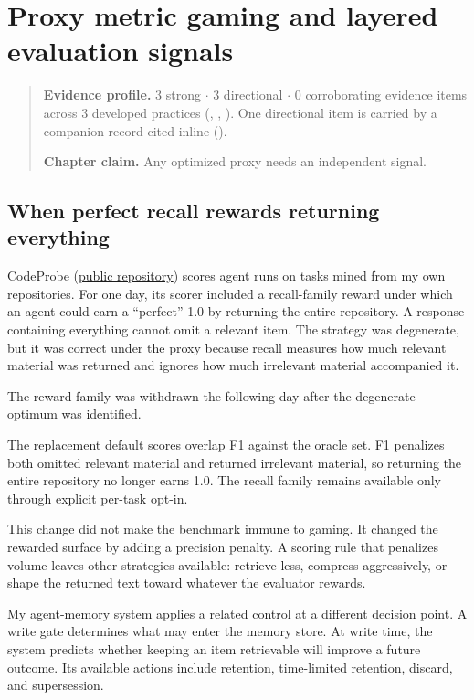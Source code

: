 \chapter{Proxy metric gaming and layered evaluation signals}
\label{ch06-proxy-gaming-layered-signals}
\begin{quote}
\textbf{Evidence profile.} 3 strong \(\cdot\) 3 directional \(\cdot\) 0 corroborating evidence items across 3 developed practices (, , ). One directional item is carried by a companion record cited inline ().

\textbf{Chapter claim.} Any optimized proxy needs an independent signal.
\end{quote}

\hypertarget{when-perfect-recall-rewards-returning-everything}{%
\section{When perfect recall rewards returning everything}\label{when-perfect-recall-rewards-returning-everything}}

CodeProbe (\href{https://github.com/sjarmak/codeprobe}{public repository}) scores agent runs on tasks mined from my own repositories. For one day, its scorer included a recall-family reward under which an agent could earn a ``perfect'' 1.0 by returning the entire repository. A response containing everything cannot omit a relevant item. The strategy was degenerate, but it was correct under the proxy because recall measures how much relevant material was returned and ignores how much irrelevant material accompanied it.

The reward family was withdrawn the following day after the degenerate optimum was identified.

The replacement default scores overlap F1 against the oracle set. F1 penalizes both omitted relevant material and returned irrelevant material, so returning the entire repository no longer earns 1.0. The recall family remains available only through explicit per-task opt-in.

This change did not make the benchmark immune to gaming. It changed the rewarded surface by adding a precision penalty. A scoring rule that penalizes volume leaves other strategies available: retrieve less, compress aggressively, or shape the returned text toward whatever the evaluator rewards.

My agent-memory system applies a related control at a different decision point. A write gate determines what may enter the memory store. At write time, the system predicts whether keeping an item retrievable will improve a future outcome. Its available actions include retention, time-limited retention, discard, and supersession.

